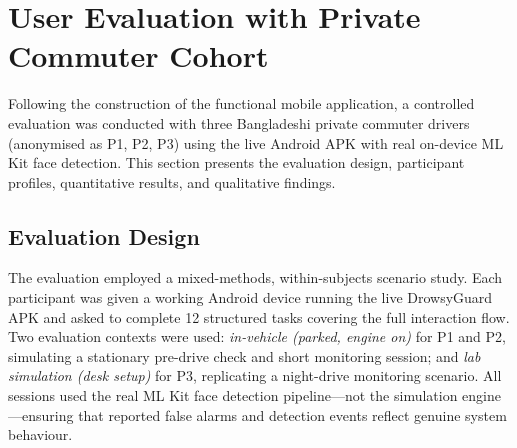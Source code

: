 \documentclass[sigconf]{acmart}
\begin{document}
\section{User Evaluation with Private Commuter Cohort}

Following the construction of the functional mobile application, a controlled evaluation was conducted with three Bangladeshi private commuter drivers (anonymised as P1, P2, P3) using the live Android APK with real on-device ML Kit face detection. This section presents the evaluation design, participant profiles, quantitative results, and qualitative findings.

\subsection{Evaluation Design}

The evaluation employed a mixed-methods, within-subjects scenario study. Each participant was given a working Android device running the live DrowsyGuard APK and asked to complete 12 structured tasks covering the full interaction flow. Two evaluation contexts were used: \textit{in-vehicle (parked, engine on)} for P1 and P2, simulating a stationary pre-drive check and short monitoring session; and \textit{lab simulation (desk setup)} for P3, replicating a night-drive monitoring scenario. All sessions used the real ML Kit face detection pipeline---not the simulation engine---ensuring that reported false alarms and detection events reflect genuine system behaviour.
\end{document}
